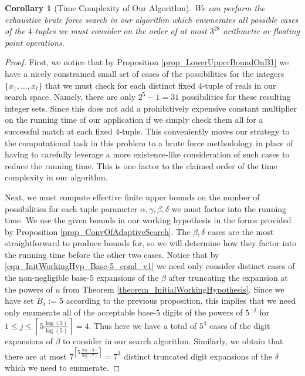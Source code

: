 \documentclass[12pt]{article}
\newtheorem{cor}[theorem]{Corollary}
\begin{document}
\begin{cor}[Time Complexity of Our Algorithm] 
We can perform the exhaustive brute force search in our algorithm which enumerates all possible 
cases of the $4$-tuples we must consider on the order of at most $3^{28}$ arithmetic or floating point 
operations. 
\end{cor} 
\begin{proof} 
First, we notice that by Proposition \ref{prop_LowerUpperBoundOnB1} we have a nicely constrained small 
set of cases of the possibilities for the integers $\{x_1,\ldots,x_t\}$ that we must check for each 
distinct fixed $4$-tuple of reals in our search space. Namely, there are only $2^5-1 = 31$ possibilities 
for these resulting integer sets. Since this does not add a prohibitively expensive constant multiplier on the 
running time of our application if we simply check them all for a successful match at each fixed $4$-tuple. 
This conveniently moves our strategy to the computational task in this problem to a brute force 
methodology in place of having to carefully leverage a more existence-like consideration of such cases to 
reduce the running time. This is one factor to the claimed order of the time complexity in our algorithm. 

Next, we must compute effective finite upper bounds on the number of possibilities for each tuple 
parameter $\alpha,\gamma,\beta,\delta$ we must factor into the running time. We use the given bounds in 
our working hypothesis in the forms provided by Proposition \ref{prop_ConvOfAdaptiveSearch}. 
The $\beta,\delta$ cases are the most straightforward to produce bounds for, so we will determine how 
they factor into the running time before the other two cases. 
Notice that by \eqref{eqn_InitWorkingHyp_Base-5_cond_v1} 
we need only consider distinct cases of the non-negligible base-$5$ expansions of 
the $\beta$ after truncating the expansion at the powers of $u$ from Theorem 
\ref{theorem_InitialWorkingHypothesis}. Since we have set $B_1 := 5$ according to the previous 
proposition, this implies that we need only enumerate all of the acceptable base-$5$ digits of the 
powers of $5^{-j}$ for $1 \leq j \leq \left\lceil 5\frac{\log(3)}{\log(5)} \right\rceil = 4$. 
Thus here we have a total of $5^4$ cases of the digit expansions of $\beta$ to consider in our 
search algorithm. Similarly, we obtain that there are at most 
$7^{\left\lceil 5\frac{\log(3)}{\log(7)} \right\rceil} = 7^3$ distinct truncated digit expansions of the 
$\delta$ which we need to enumerate. 


\end{proof}
\end{document}
